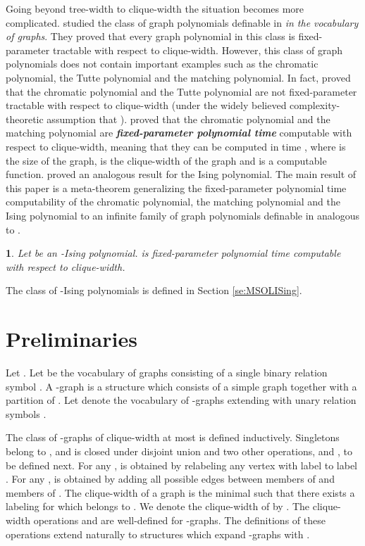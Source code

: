 \documentclass{llncs}
\newtheorem{thm}{\protect\theoremname}
\providecommand{\theoremname}{Theorem}
\begin{document}
Going beyond tree-width to clique-width the situation becomes more
complicated. \cite{ar:CMR2000} studied the class of graph polynomials
definable in  {\em in the vocabulary of graphs}. They proved
that every graph polynomial in this class is fixed-parameter tractable
with respect to clique-width. However, this class of graph polynomials
does not contain important examples such as the chromatic polynomial,
the Tutte polynomial and the matching polynomial. In fact, \cite{ar:FominGolovachLokshtanov10}
proved that the chromatic polynomial and the Tutte polynomial are
not fixed-parameter tractable with respect to clique-width (under
the widely believed complexity-theoretic assumption that ).
\cite{makowsky2006computing} proved that the chromatic polynomial
and the matching polynomial are {\em\bf fixed-parameter polynomial time}
computable with respect to clique-width, meaning that they can be
computed in time , where  is the size of the graph,
 is the clique-width of the graph and  is a computable
function. \cite{kotek2012complexity} proved an analogous result for
the Ising polynomial. The main result of this paper is a meta-theorem
generalizing the fixed-parameter polynomial time computability of
the chromatic polynomial, the matching polynomial and the Ising polynomial
to an infinite family of graph polynomials definable in  analogous
to \cite{ar:CMR2000}. 
\begin{thm}
Let  be an -Ising polynomial.  is fixed-parameter polynomial
time computable with respect to clique-width. 
\end{thm}
The class of -Ising polynomials is defined in Section \ref{se:MSOLISing}. 


\section{Preliminaries}

Let . Let  be the vocabulary
of graphs  consisting
of a single binary relation symbol . A -graph is a structure  which consists of a simple graph  together with a partition  of .  Let
 denote the vocabulary of -graphs 
extending  with unary relation symbols . 

The class  of -graphs of clique-width at most  is defined inductively. Singletons belong to , and  is closed under disjoint union  and 
two other operations,  and , to be defined next. 
For any ,  is obtained by relabeling any vertex with label  to label . 
For any ,  is obtained by adding all possible edges  between members of  
and members of . The clique-width of a graph  is the minimal  such that there exists a labeling  for 
which  belongs to . We denote the clique-width of  by .
The clique-width operations  and  are well-defined for -graphs.
The definitions of these operations extend naturally to structures  which expand -graphs with . 
\end{document}
